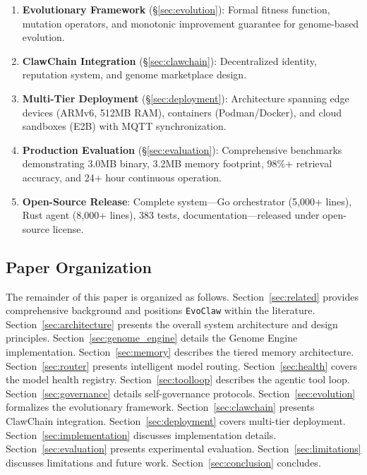 \documentclass{article}
\newcommand{\evoclaw}{\texttt{EvoClaw}\xspace}
\begin{document}
\begin{enumerate}[leftmargin=*]
    \item \textbf{Evolutionary Framework} (\S\ref{sec:evolution}): Formal fitness function, mutation operators, and monotonic improvement guarantee for genome-based evolution.
    
    \item \textbf{ClawChain Integration} (\S\ref{sec:clawchain}): Decentralized identity, reputation system, and genome marketplace design.
    
    \item \textbf{Multi-Tier Deployment} (\S\ref{sec:deployment}): Architecture spanning edge devices (ARMv6, 512MB RAM), containers (Podman/Docker), and cloud sandboxes (E2B) with MQTT synchronization.
    
    \item \textbf{Production Evaluation} (\S\ref{sec:evaluation}): Comprehensive benchmarks demonstrating 3.0MB binary, 3.2MB memory footprint, 98\%+ retrieval accuracy, and 24+ hour continuous operation.
    
    \item \textbf{Open-Source Release}: Complete system—Go orchestrator (5,000+ lines), Rust agent (8,000+ lines), 383 tests, documentation—released under open-source license.
\end{enumerate}

\subsection{Paper Organization}

The remainder of this paper is organized as follows. Section~\ref{sec:related} provides comprehensive background and positions \evoclaw{} within the literature. Section~\ref{sec:architecture} presents the overall system architecture and design principles. Section~\ref{sec:genome_engine} details the Genome Engine implementation. Section~\ref{sec:memory} describes the tiered memory architecture. Section~\ref{sec:router} presents intelligent model routing. Section~\ref{sec:health} covers the model health registry. Section~\ref{sec:toolloop} describes the agentic tool loop. Section~\ref{sec:governance} details self-governance protocols. Section~\ref{sec:evolution} formalizes the evolutionary framework. Section~\ref{sec:clawchain} presents ClawChain integration. Section~\ref{sec:deployment} covers multi-tier deployment. Section~\ref{sec:implementation} discusses implementation details. Section~\ref{sec:evaluation} presents experimental evaluation. Section~\ref{sec:limitations} discusses limitations and future work. Section~\ref{sec:conclusion} concludes.
\end{document}
